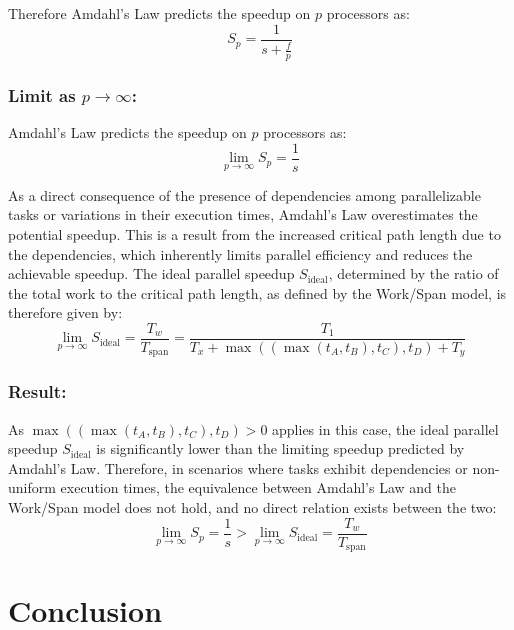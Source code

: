 \documentclass[
  a4paper, %
]{kaohandt}
\begin{document}
Therefore Amdahl's Law predicts the speedup on $p$ processors as:
\begin{equation}
  S_p = \frac{1}{s + \frac{f}{p}}
\end{equation}

\subsubsection*{Limit as $p \rightarrow \infty$:}
Amdahl's Law predicts the speedup on $p$ processors as:
\begin{equation}
  \lim_{p \to \infty} S_p = \frac{1}{s}
\end{equation}

As a direct consequence of the presence of dependencies among parallelizable tasks or variations in their execution times, Amdahl's Law overestimates the potential speedup. This is a result from the increased critical path length due to the dependencies, which inherently limits parallel efficiency and reduces the achievable speedup. The ideal parallel speedup $S_{\text{ideal}}$, determined by the ratio of the total work to the critical path length, as defined by the Work/Span model, is therefore given by:
\begin{equation}
  \lim_{p \to \infty} S_{\text{ideal}} = \frac{T_w}{T_{\text{span}}} = \frac{T_1}{T_x + \max((\max(t_A, t_B), t_C), t_D) + T_y}
\end{equation}

\subsubsection*{Result:}

As $\max((\max(t_A, t_B), t_C), t_D) > 0$ applies in this case, the ideal parallel speedup $S_{\text{ideal}}$ is significantly lower than the limiting speedup predicted by Amdahl's Law. Therefore, in scenarios where tasks exhibit dependencies or non-uniform execution times, the equivalence between Amdahl's Law and the Work/Span model does not hold, and no direct relation exists between the two:
\begin{equation}
  \lim_{p \to \infty} S_p = \frac{1}{s} > \lim_{p \to \infty} S_{\text{ideal}} = \frac{T_w}{T_{\text{span}}}
\end{equation}

\section{Conclusion}
\end{document}

